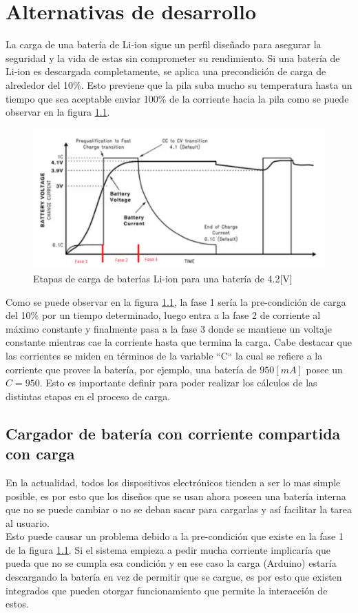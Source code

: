\chapter{Alternativas de desarrollo}\label{alternativas}
La carga de una batería de Li-ion sigue un perfil diseñado para asegurar la seguridad y la vida de estas sin comprometer su rendimiento. Si una batería de Li-ion es descargada completamente, se aplica una precondición de carga de alrededor del 10\%. Esto previene que la pila suba mucho su temperatura hasta un tiempo que sea aceptable enviar 100\% de la corriente hacia la pila como se puede observar en la figura \ref{grafico}.\\
\begin{figure}[H]
\centering
\includegraphics[scale=0.6]{figuras/bateria/grafico.png}
\caption{Etapas de carga de baterías Li-ion para una batería de 4.2[V]}
\label{grafico}
\end{figure}

Como se puede observar en la figura \ref{grafico}, la fase 1 sería la pre-condición de carga del 10\% por un tiempo determinado, luego entra a la fase 2 de corriente al máximo constante y finalmente pasa a la fase 3 donde se mantiene un voltaje constante mientras cae la corriente hasta que termina la carga. 
Cabe destacar que las corrientes se miden en términos de la variable ``C`` la cual se refiere a la corriente que provee la batería, por ejemplo, una batería de $950[mA]$ posee un $C=950$. Esto es importante definir para poder realizar los cálculos de las distintas etapas en el proceso de carga.
\section{Cargador de batería con corriente compartida con carga}
En la actualidad, todos los dispositivos electrónicos tienden a ser lo mas simple posible, es por esto que los diseños que se usan ahora poseen una batería interna que no se puede cambiar o no se deban sacar para cargarlas y así facilitar la tarea al usuario. \\
Esto puede causar un problema debido a la pre-condición que existe en la fase 1 de la figura \ref{grafico}. Si el sistema empieza a pedir mucha corriente implicaría que pueda que no se cumpla esa condición y en ese caso la carga (Arduino) estaría descargando la batería en vez de permitir que se cargue, es por esto que existen integrados que pueden otorgar funcionamiento que permite la interacción de estos.\\
